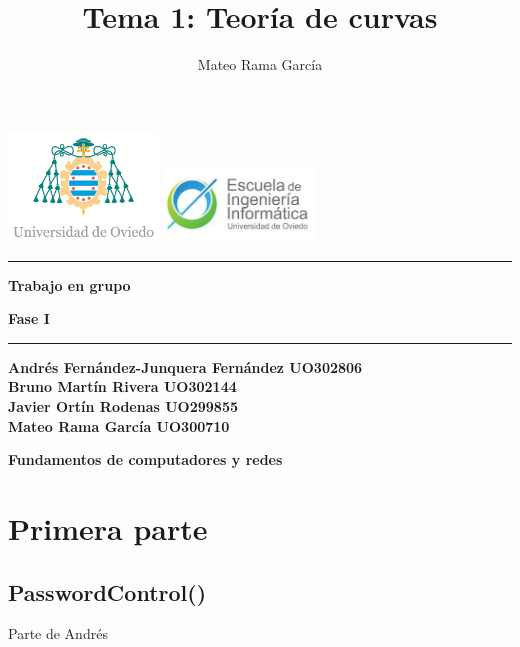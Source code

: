 \documentclass[11pt,a4paper]{article}
\title{\textbf{Tema 1: } Teoría de curvas}
\author{Mateo Rama García}
\begin{document}
  
\begin{titlepage}
  \centering  
  \vspace*{1cm}  %
  \includegraphics[width=0.3\textwidth]{uniovi.jpg} \hspace{2cm}
  \includegraphics[width=0.3\textwidth]{descarga.jpeg} \\[1cm] 
  \vspace{\fill}%
  \hrule
  \vspace{0.5cm}
  {\Huge \bfseries Trabajo en grupo\par}
  \vspace{0.5cm}
  {\Large \bfseries Fase I\par}
  \vspace{0.5cm}
  \hrule
  \vspace{1cm}
  {\bfseries Andrés Fernández-Junquera Fernández UO302806\\[3ex]
  Bruno Martín Rivera UO302144\\[3ex]
  Javier Ortín Rodenas UO299855\\[3ex]
  Mateo Rama García UO300710\par} %
  \vspace{\fill}  %
  {\Large \textbf{Fundamentos de computadores y redes}\par}
\end{titlepage}



\newpage

\tableofcontents

\newpage


\section{Primera parte}
\subsection{PasswordControl()}
Parte de Andrés
\end{document}
